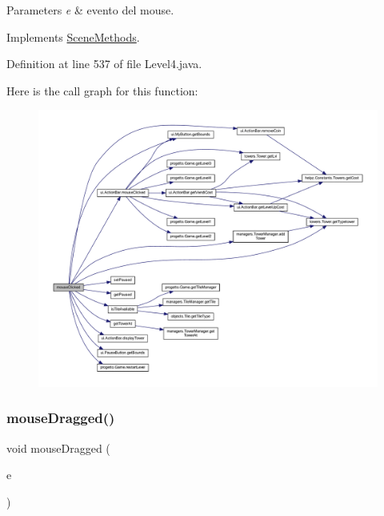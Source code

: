 \begin{DoxyParams}{Parameters}
{\em e} & evento del mouse. \\
\hline
\end{DoxyParams}


Implements \hyperlink{interfacescenes_1_1_scene_methods_a45d56bd84238e8b56589dfc732e2b2cf}{Scene\+Methods}.



Definition at line 537 of file Level4.\+java.

Here is the call graph for this function\+:
\nopagebreak
\begin{figure}[H]
\begin{center}
\leavevmode
\includegraphics[width=350pt]{classscenes_1_1_level4_a45d56bd84238e8b56589dfc732e2b2cf_cgraph}
\end{center}
\end{figure}
\mbox{\label{classscenes_1_1_level4_adbfc0588c017133c9b7070474402b72f}} 
\subsubsection{\texorpdfstring{mouse\+Dragged()}{mouseDragged()}}
{\footnotesize\ttfamily void mouse\+Dragged (\begin{DoxyParamCaption}\item[{Mouse\+Event}]{e }\end{DoxyParamCaption})}



